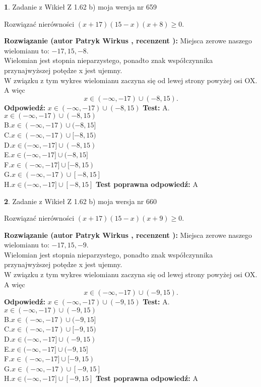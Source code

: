 \documentclass[12pt, a4paper]{article}
\theoremstyle{definition} %
\newtheorem{zad}{}
\newcommand{\zadStart}[1]{\begin{zad}#1\newline}
\newcommand{\zadStop}{\end{zad}}
\newcommand{\rozwStart}[2]{\noindent \textbf{Rozwiązanie (autor #1 , recenzent #2): }\newline}
\newcommand{\rozwStop}{\newline}
\newcommand{\odpStart}{\noindent \textbf{Odpowiedź:}\newline}
\newcommand{\odpStop}{\newline}
\newcommand{\testStart}{\noindent \textbf{Test:}\newline}
\newcommand{\testStop}{\newline}
\newcommand{\kluczStart}{\noindent \textbf{Test poprawna odpowiedź:}\newline}
\newcommand{\kluczStop}{\newline}
\begin{document}
\zadStart{Zadanie z Wikieł Z 1.62 b) moja wersja nr 659}

Rozwiązać nierówności $(x+17)(15-x)(x+8)\ge0$.
\zadStop
\rozwStart{Patryk Wirkus}{}
Miejsca zerowe naszego wielomianu to: $-17, 15, -8$.\\
Wielomian jest stopnia nieparzystego, ponadto znak współczynnika przy\linebreak najwyższej potędze x jest ujemny.\\ W związku z tym wykres wielomianu zaczyna się od lewej strony powyżej osi OX. A więc $$x \in (-\infty,-17) \cup (-8,15).$$
\rozwStop
\odpStart
$x \in (-\infty,-17) \cup (-8,15)$
\odpStop
\testStart
A.$x \in (-\infty,-17) \cup (-8,15)$\\
B.$x \in (-\infty,-17) \cup (-8,15]$\\
C.$x \in (-\infty,-17) \cup [-8,15)$\\
D.$x \in (-\infty,-17] \cup (-8,15)$\\
E.$x \in (-\infty,-17] \cup (-8,15]$\\
F.$x \in (-\infty,-17] \cup [-8,15)$\\
G.$x \in (-\infty,-17) \cup [-8,15]$\\
H.$x \in (-\infty,-17] \cup [-8,15]$
\testStop
\kluczStart
A
\kluczStop



\zadStart{Zadanie z Wikieł Z 1.62 b) moja wersja nr 660}

Rozwiązać nierówności $(x+17)(15-x)(x+9)\ge0$.
\zadStop
\rozwStart{Patryk Wirkus}{}
Miejsca zerowe naszego wielomianu to: $-17, 15, -9$.\\
Wielomian jest stopnia nieparzystego, ponadto znak współczynnika przy\linebreak najwyższej potędze x jest ujemny.\\ W związku z tym wykres wielomianu zaczyna się od lewej strony powyżej osi OX. A więc $$x \in (-\infty,-17) \cup (-9,15).$$
\rozwStop
\odpStart
$x \in (-\infty,-17) \cup (-9,15)$
\odpStop
\testStart
A.$x \in (-\infty,-17) \cup (-9,15)$\\
B.$x \in (-\infty,-17) \cup (-9,15]$\\
C.$x \in (-\infty,-17) \cup [-9,15)$\\
D.$x \in (-\infty,-17] \cup (-9,15)$\\
E.$x \in (-\infty,-17] \cup (-9,15]$\\
F.$x \in (-\infty,-17] \cup [-9,15)$\\
G.$x \in (-\infty,-17) \cup [-9,15]$\\
H.$x \in (-\infty,-17] \cup [-9,15]$
\testStop
\kluczStart
A
\kluczStop
\end{document}
